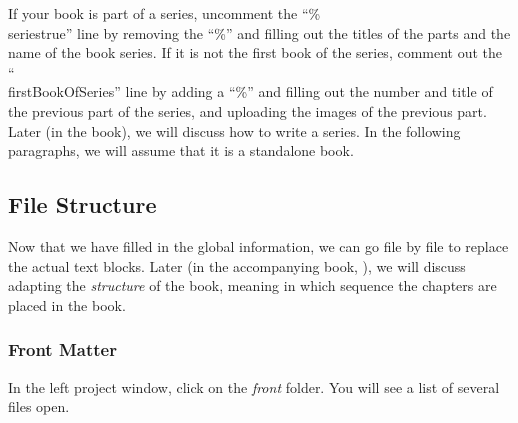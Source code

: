 If your book is part of a series, uncomment the ``\%\\seriestrue'' line by removing the ``\%'' and filling out the titles of the parts and the name of the book series. If it is not the first book of the series, comment out the ``\\firstBookOfSeries'' line by adding a ``\%'' and filling out the number and title of the previous part of the series, and uploading the images of the previous part. Later (in the book), we will discuss how to write a series. In the following paragraphs, we will assume that it is a standalone book.



\subsection{File Structure}\label{filestructure:sec}

Now that we have filled in the global information, we can go file by file to replace the actual text blocks. Later (in the accompanying book, ), we will discuss adapting the \textit{structure} of the book, meaning in which sequence the chapters are placed in the book.

\subsubsection{Front Matter}\label{frontmatter:sec}

In the left project window, click on the \textit{front} folder. You will see a list of several files open.

